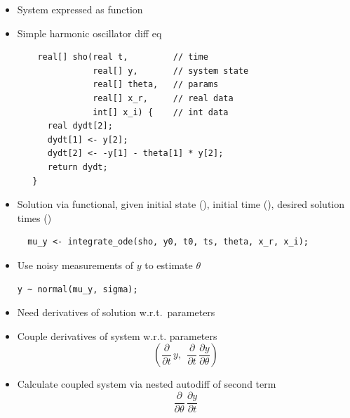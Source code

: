 \documentclass[10pt]{report}
\begin{document}
\begin{itemize}
\item System expressed as function
\item Simple harmonic oscillator diff eq
{\footnotesize
\begin{Verbatim}
    real[] sho(real t,         // time
               real[] y,       // system state
               real[] theta,   // params
               real[] x_r,     // real data
               int[] x_i) {    // int data
      real dydt[2];
      dydt[1] <- y[2];
      dydt[2] <- -y[1] - theta[1] * y[2];
      return dydt;
   }
\end{Verbatim}
}
\end{itemize}

\begin{itemize}
\item Solution via functional, given initial state (), 
initial time (), desired solution times ()
{\footnotesize
\begin{Verbatim}
  mu_y <- integrate_ode(sho, y0, t0, ts, theta, x_r, x_i);
\end{Verbatim}
}
\item Use noisy measurements of $y$ to estimate $\theta$
\begin{Verbatim}
y ~ normal(mu_y, sigma);
\end{Verbatim}
\end{itemize}

\begin{itemize}
\item Need derivatives of solution w.r.t.\ parameters
\item Couple derivatives of system  w.r.t. parameters
\[
\left( 
\frac{\partial}{\partial t} \, y, \ \
\frac{\partial}{\partial t} \, \frac{\partial y}{\partial \theta}
\right)
\]
\item Calculate coupled system via nested autodiff of second term
\[
\frac{\partial}{\partial \theta}
\,
\frac{\partial y}{\partial t}
\]
\end{itemize}
\end{document}
